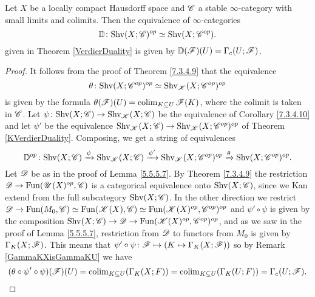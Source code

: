 \documentclass[../../thesis.tex]{subfiles}
\begin{document}
\begin{proposition}[{\cite[Proposition 5.5.5.10]{HA}}]
    Let $X$ be a locally compact Hausdorff space and $\mathscr{C}$ a stable $\infty$-category with small limits and colimits.
    Then the equivalence of $\infty$-categories
    \[
        \mathbb{D} \colon \mathrm{Shv}(X;\mathscr{C})^{op} \simeq \mathrm{Shv}(X;\mathscr{C}^{op}).
    \]
    given in Theorem \ref{VerdierDuality} is given by $\mathbb{D}(\mathscr{F})(U) = \Gamma_c(U;\mathscr{F})$.
\end{proposition}
\begin{proof}
    It follows from the proof of Theorem \ref{7.3.4.9} that the equivalence
    \[
        \theta\colon \mathrm{Shv}(X;\mathscr{C}^{op})^{op} \simeq \mathrm{Shv}_{\mathscr{K}}(X;\mathscr{C}^{op})^{op}
    \]
    is given by the formula $\theta(\mathscr{F})(U) = \operatorname{colim}_{K\subseteq U}\mathscr{F}(K)$, where the colimit is taken in $\mathscr{C}$.
    Let $\psi\colon \mathrm{Shv}(X;\mathscr{C}) \to \mathrm{Shv}_{\mathscr{K}}(X;\mathscr{C})$ be the equivalence of Corollary \ref{7.3.4.10} and let $\psi'$ be the equivalence $\mathrm{Shv}_{\mathscr{K}}(X;\mathscr{C}) \to \mathrm{Shv}_{\mathscr{K}}(X;\mathscr{C}^{op})^{op}$ of Theorem \ref{KVerdierDuality}.
    Composing, we get a string of equivalences
    \[
        \mathbb{D}^{op} \colon \mathrm{Shv}(X;\mathscr{C}) \xrightarrow{\psi} \mathrm{Shv}_{\mathscr{K}}(X;\mathscr{C}) \xrightarrow{\psi'} \mathrm{Shv}_{\mathscr{K}}(X;\mathscr{C}^{op})^{op} \xrightarrow{\theta} \mathrm{Shv}(X;\mathscr{C}^{op})^{op}.
    \]
    Let $\mathscr{D}$ be as in the proof of Lemma \ref{5.5.5.7}.
    By Theorem \ref{7.3.4.9} the restriction $\mathscr{D}\to \mathrm{Fun}(\mathscr{U}(X)^{op}, \mathscr{C})$ is a categorical equivalence onto $\mathrm{Shv}(X;\mathscr{C})$, since we Kan extend from the full subcategory $\mathrm{Shv}(X;\mathscr{C})$.
    \newline
    In the other direction we restrict $\mathscr{D} \to \mathrm{Fun}(M_0, \mathscr{C}) \simeq \mathrm{Fun}(\mathscr{K}(X), \mathscr{C}) \simeq \mathrm{Fun}(\mathscr{K}(X)^{op}, \mathscr{C}^{op})^{op}$ and $\psi' \circ \psi$ is given by the composition $\mathrm{Shv}(X;\mathscr{C}) \to \mathscr{D} \to \mathrm{Fun}(\mathscr{K}(X)^{op}, \mathscr{C}^{op})^{op}$, and as we saw in the proof of Lemma \ref{5.5.5.7}, restriction from $\mathscr{D}$ to functors from $M_0$ is given by $\Gamma_K(X;\mathscr{F})$.
    This means that $\psi' \circ \psi \colon \mathscr{F} \mapsto \left( K \mapsto \Gamma_K(X;\mathscr{F}) \right)$ so by Remark \ref{GammaKXisGammaKU} we have
    \[
        (\theta \circ \psi' \circ \psi)(\mathscr{F})(U) = \operatorname{colim}_{K\subseteq U}(\Gamma_K(X;F)) = \operatorname{colim}_{K\subseteq U}(\Gamma_K(U;F)) = \Gamma_c(U;\mathscr{F}).\qedhere
    \]
\end{proof}
\end{document}
